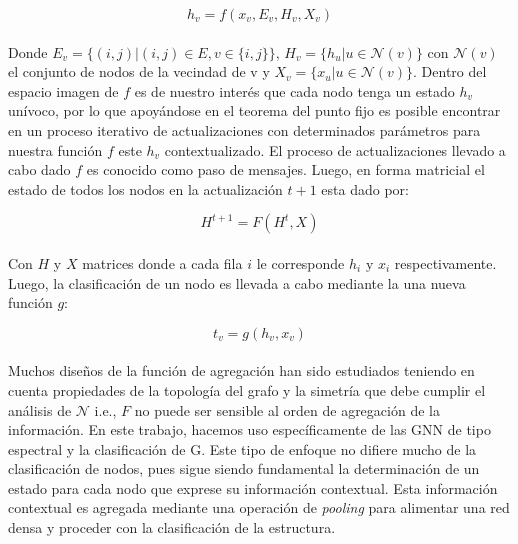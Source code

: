 	\begin{equation}
		h_v = f(x_v, E_v, H_v, X_v)
	\end{equation}
	\\
	Donde $E_v = \{(i, j)| (i, j) \in E, v \in \{i, j\}\}$,  $H_v = \{h_u| u \in \mathcal{N}(v)\}$ con $\mathcal{N}(v)$ el conjunto de nodos de la vecindad de v y $X_v = \{x_u| u \in \mathcal{N}(v)\}$. Dentro del espacio imagen de $f$ es de nuestro interés que cada nodo tenga un estado $h_v$ unívoco, por lo que apoyándose en el teorema del punto fijo \citep{brown1988fixed} es posible encontrar en un proceso iterativo de actualizaciones con determinados parámetros para nuestra función $f$ este $h_v$ contextualizado. El proceso de actualizaciones llevado a cabo dado $f$ es conocido como paso de mensajes. Luego, en forma matricial el estado de todos los nodos en la actualización $t+1$ esta dado por:
	
	\begin{equation}
		H^{t+1} = F(H^t, X)
	\end{equation} 
	\\
	Con $H$ y $X$ matrices donde a cada fila $i$ le corresponde $h_i \text{ y } x_i$ respectivamente. Luego, la clasificación de un nodo es llevada a cabo mediante la una nueva función $g$:	
	
	\begin{equation}
		t_v = g(h_v, x_v)
	\end{equation}
	\\
	Muchos diseños de la función de agregación han sido estudiados \citep{kipf2017semisupervised} teniendo en cuenta propiedades de la topología del grafo y la simetría que debe cumplir el análisis de $\mathcal{N}$ i.e., $F$ no puede ser sensible al orden de agregación de la información. En este trabajo, hacemos uso específicamente de las GNN de tipo espectral \citep{Wu_2021} y la clasificación de G. Este tipo de enfoque no difiere mucho de la clasificación de nodos, pues sigue siendo fundamental la determinación de un estado para cada nodo que exprese su información contextual. Esta información contextual es agregada mediante una operación de \textit{pooling} para alimentar una red densa y proceder con la clasificación de la estructura.
	
%
%	

